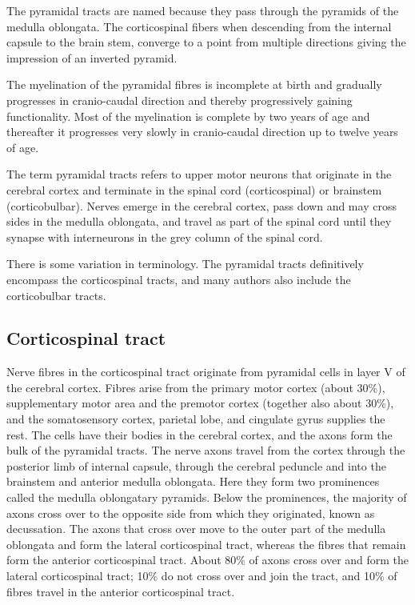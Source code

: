 The pyramidal tracts are named because they pass through the pyramids of the medulla oblongata. The corticospinal fibers when descending from the internal capsule to the brain stem, converge to a point from multiple directions giving the impression of an inverted pyramid.

The myelination of the pyramidal fibres is incomplete at birth and gradually progresses in cranio-caudal direction and thereby progressively gaining functionality. Most of the myelination is complete by two years of age and thereafter it progresses very slowly in cranio-caudal direction up to twelve years of age.

The term pyramidal tracts refers to upper motor neurons that originate in the cerebral cortex and terminate in the spinal cord (corticospinal) or brainstem (corticobulbar). Nerves emerge in the cerebral cortex, pass down and may cross sides in the medulla oblongata, and travel as part of the spinal cord until they synapse with interneurons in the grey column of the spinal cord.

There is some variation in terminology. The pyramidal tracts definitively encompass the corticospinal tracts, and many authors also include the corticobulbar tracts.

\hypertarget{corticospinal-tract}{%
\subsection{Corticospinal tract}\label{corticospinal-tract}}

Nerve fibres in the corticospinal tract originate from pyramidal cells in layer V of the cerebral cortex. Fibres arise from the primary motor cortex (about 30\%), supplementary motor area and the premotor cortex (together also about 30\%), and the somatosensory cortex, parietal lobe, and cingulate gyrus supplies the rest. The cells have their bodies in the cerebral cortex, and the axons form the bulk of the pyramidal tracts. The nerve axons travel from the cortex through the posterior limb of internal capsule, through the cerebral peduncle and into the brainstem and anterior medulla oblongata. Here they form two prominences called the medulla oblongatary pyramids. Below the prominences, the majority of axons cross over to the opposite side from which they originated, known as decussation. The axons that cross over move to the outer part of the medulla oblongata and form the lateral corticospinal tract, whereas the fibres that remain form the anterior corticospinal tract. About 80\% of axons cross over and form the lateral corticospinal tract; 10\% do not cross over and join the tract, and 10\% of fibres travel in the anterior corticospinal tract.

